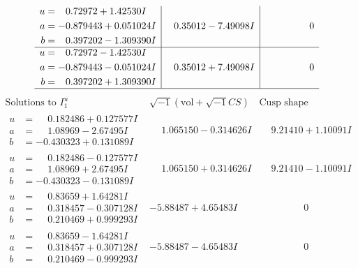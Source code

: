 \documentclass[1p]{elsarticle_modified}
\theoremstyle{definition}
\newcommand{\I}{\sqrt{-1}}
\begin{document}
$$\begin{array}{c|c|c}
\begin{aligned}
u &= \phantom{-}0.72972 + 1.42530 I \\
a &= -0.879443 + 0.051024 I \\
b &= \phantom{-}0.397202 - 1.309390 I\end{aligned}
 & \phantom{-}0.35012 - 7.49098 I & \phantom{-0.000000 } 0 \\ \hline\begin{aligned}
u &= \phantom{-}0.72972 - 1.42530 I \\
a &= -0.879443 - 0.051024 I \\
b &= \phantom{-}0.397202 + 1.309390 I\end{aligned}
 & \phantom{-}0.35012 + 7.49098 I & \phantom{-0.000000 } 0\\
 \hline 
 \end{array}$$\newpage$$\begin{array}{c|c|c}  
\text{Solutions to }I^u_{1}& \I (\text{vol} + \sqrt{-1}CS) & \text{Cusp shape}\\
 \hline 
\begin{aligned}
u &= \phantom{-}0.182486 + 0.127577 I \\
a &= \phantom{-}1.08969 - 2.67495 I \\
b &= -0.430323 + 0.131089 I\end{aligned}
 & \phantom{-}1.065150 - 0.314626 I & \phantom{-}9.21410 + 1.10091 I \\ \hline\begin{aligned}
u &= \phantom{-}0.182486 - 0.127577 I \\
a &= \phantom{-}1.08969 + 2.67495 I \\
b &= -0.430323 - 0.131089 I\end{aligned}
 & \phantom{-}1.065150 + 0.314626 I & \phantom{-}9.21410 - 1.10091 I \\ \hline\begin{aligned}
u &= \phantom{-}0.83659 + 1.64281 I \\
a &= \phantom{-}0.318457 - 0.307128 I \\
b &= \phantom{-}0.210469 + 0.999293 I\end{aligned}
 & -5.88487 + 4.65483 I & \phantom{-0.000000 } 0 \\ \hline\begin{aligned}
u &= \phantom{-}0.83659 - 1.64281 I \\
a &= \phantom{-}0.318457 + 0.307128 I \\
b &= \phantom{-}0.210469 - 0.999293 I\end{aligned}
 & -5.88487 - 4.65483 I & \phantom{-0.000000 } 0 \\ \hline\begin{aligned}

\end{aligned}
\end{array}$$
\end{document}
